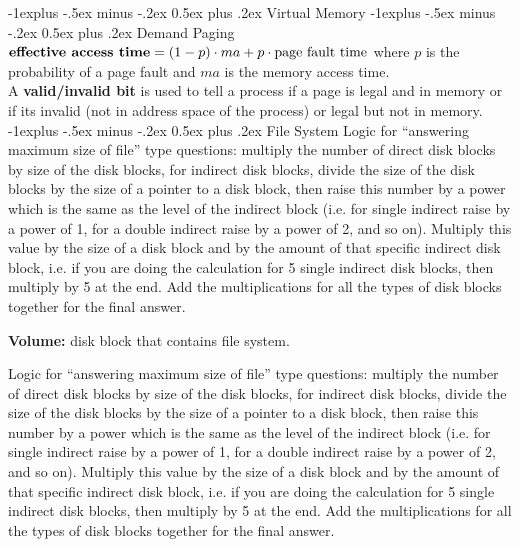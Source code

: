 \documentclass[letterpaper, 8pt]{extarticle}
\makeatletter
\renewcommand{\section}{\@startsection{section}{1}{0mm}%
                                {-1explus -.5ex minus -.2ex}%
                                {0.5ex plus .2ex}%
                                {\normalfont\normalsize\bfseries}}
\renewcommand{\subsection}{\@startsection{subsection}{2}{0mm}%
                                {-1explus -.5ex minus -.2ex}%
                                {0.5ex plus .2ex}%
                                {\normalfont\small\bfseries}}
\makeatother
\begin{document}
\begin{multicols*}{6}
    \section{Virtual Memory}
    \subsection{Demand Paging}
    $\text{\textbf{effective access time}} = (1-p) \cdot ma + p \cdot \text
        {page fault time}$ where $p$ is the probability of a page fault and $ma$
    is the memory access time.\\
    A \textbf{valid/invalid bit} is used to tell a process if a page is legal 
    and in memory or if its invalid (not in address space of the process) or 
    legal but not in memory.\\

    \section{File System}
    Logic for ``answering maximum size of file'' type questions: multiply the
    number of direct disk blocks by size of the disk blocks, for indirect
    disk blocks, divide the size of the disk blocks by the size of a pointer to
    a disk block, then raise this number by a power which is the same as the
    level of the indirect block (i.e. for single indirect raise by a power of
    1, for a double indirect raise by a power of 2, and so on).
    Multiply this value
    by the size of a disk block and by the amount of that specific indirect
    disk block, i.e. if you are doing the calculation for 5 single indirect
    disk blocks, then multiply by 5 at the end. Add the multiplications
    for all the types of disk blocks together for the final answer.

    \textbf{Volume:} disk block that contains file system.

    Logic for ``answering maximum size of file'' type questions: multiply the
    number of direct disk blocks by size of the disk blocks, for indirect
    disk blocks, divide the size of the disk blocks by the size of a pointer to
    a disk block, then raise this number by a power which is the same as the
    level of the indirect block (i.e. for single indirect raise by a power of
    1, for a double indirect raise by a power of 2, and so on).
    Multiply this value
    by the size of a disk block and by the amount of that specific indirect
    disk block, i.e. if you are doing the calculation for 5 single indirect
    disk blocks, then multiply by 5 at the end. Add the multiplications
    for all the types of disk blocks together for the final answer.
    

\end{multicols*}
\end{document}
